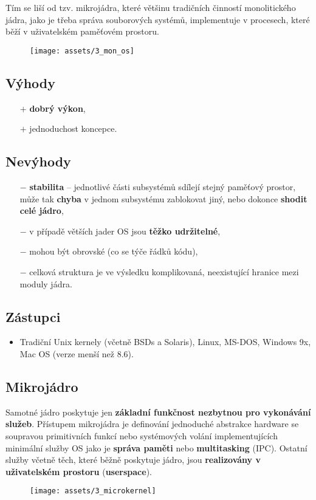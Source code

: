 Tím se liší od tzv. mikrojádra, které většinu tradičních činností monolitického jádra, jako je třeba správa souborových systémů, implementuje v procesech, které běží v uživatelském paměťovém prostoru.
\begin{figure}[H]
    \texttt{[image: assets/3\_mon\_os]}
\end{figure}

\subsection*{Výhody}
\begin{itemize}
    \item[$+$] \textbf{dobrý výkon},
    \item[$+$] jednoduchost koncepce.
\end{itemize}
\subsection*{Nevýhody}
\begin{itemize}
    \item[$-$] \textbf{stabilita} -- jednotlivé části subsystémů sdílejí stejný paměťový prostor, může tak \textbf{chyba} v jednom subsystému zablokovat jiný, nebo dokonce \textbf{shodit celé jádro},
    \item[$-$] v případě větších jader OS jsou \textbf{těžko udržitelné},
    \item[$-$] mohou být obrovské (co se týče řádků kódu),
    \item[$-$] celková struktura je ve výsledku komplikovaná, neexistující hranice mezi moduly jádra.
\end{itemize}
\subsection*{Zástupci}
\begin{itemize}
    \item Tradiční Unix kernely (včetně BSDs a Solaris), Linux, MS-DOS, Windows 9x, Mac OS (verze menší než 8.6).
\end{itemize}

\subsection{Mikrojádro}
Samotné jádro poskytuje jen \textbf{základní funkčnost nezbytnou pro vykonávání služeb}. Přístupem mikrojádra je definování jednoduché abstrakce hardware se soupravou primitivních funkcí nebo systémových volání implementujících minimální služby OS jako je \textbf{správa paměti} nebo \textbf{multitasking} (IPC). Ostatní služby včetně těch, které běžně poskytuje jádro, jsou \textbf{realizovány v uživatelském prostoru} (\textbf{userspace}).
\begin{figure}[H]
    \centering
    \texttt{[image: assets/3\_microkernel]}
\end{figure}
